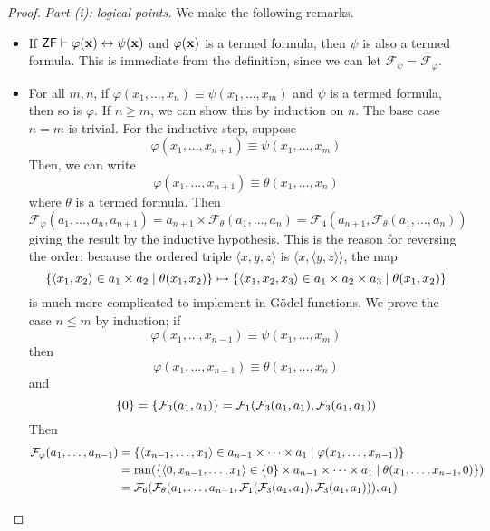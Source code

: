 \begin{proof}
    \emph{Part (i): logical points.}
    We make the following remarks.
    \begin{itemize}
        \item If \( \mathsf{ZF} \vdash \varphi(\vb x) \leftrightarrow \psi(\vb x) \) and \( \varphi(\vb x) \) is a termed formula, then \( \psi \) is also a termed formula.
        This is immediate from the definition, since we can let \( \mathcal F_\psi = \mathcal F_\varphi \).
        \item For all \( m, n \), if \( \varphi(x_1, \dots, x_n) \equiv \psi(x_1, \dots, x_m) \) and \( \psi \) is a termed formula, then so is \( \varphi \).
        If \( n \geq m \), we can show this by induction on \( n \).
        The base case \( n = m \) is trivial.
        For the inductive step, suppose
        \[ \varphi(x_1, \dots, x_{n+1}) \equiv \psi(x_1, \dots, x_m) \]
        Then, we can write
        \[ \varphi(x_1, \dots, x_{n+1}) \equiv \theta(x_1, \dots, x_n) \]
        where \( \theta \) is a termed formula.
        Then
        \[ \mathcal F_\varphi(a_1, \dots, a_n, a_{n+1}) = a_{n+1} \times \mathcal F_\theta(a_1, \dots, a_n) = \mathcal F_4(a_{n+1}, \mathcal F_\theta(a_1, \dots, a_n)) \]
        giving the result by the inductive hypothesis.
        This is the reason for reversing the order: because the ordered triple \( \langle x, y, z \rangle \) is \( \langle x, \langle y, z \rangle \rangle \), the map
        \[ \qty{\langle x_1, x_2 \rangle \in a_1 \times a_2 \mid \theta(x_1, x_2)} \mapsto \qty{\langle x_1, x_2, x_3 \rangle \in a_1 \times a_2 \times a_3 \mid \theta(x_1, x_2)} \]
        is much more complicated to implement in G\"odel functions.
        We prove the case \( n \leq m \) by induction; if
        \[ \varphi(x_1, \dots, x_{n-1}) \equiv \psi(x_1, \dots, x_m) \]
        then
        \[ \varphi(x_1, \dots, x_{n-1}) \equiv \theta(x_1, \dots, x_n) \]
        and
        \[ \qty{0} = \qty{\mathcal F_3(a_1, a_1)} = \mathcal F_1(\mathcal F_3(a_1, a_1), \mathcal F_3(a_1, a_1)) \]
        Then
        \begin{align*}
            \mathcal F_\varphi(a_1, \dots, a_{n-1}) &= \qty{\langle x_{n-1}, \dots, x_1 \rangle \in a_{n-1} \times \dots \times a_1 \mid \varphi(x_1, \dots, x_{n-1})} \\
            &= \ran(\qty{\langle 0, x_{n-1}, \dots, x_1 \rangle \in \qty{0} \times a_{n-1} \times \dots \times a_1 \mid \theta(x_1, \dots, x_{n-1}, 0)}) \\
            &= \mathcal F_6(\mathcal F_\theta(a_1, \dots, a_{n-1}, \mathcal F_1(\mathcal F_3(a_1, a_1), \mathcal F_3(a_1, a_1))), a_1)

\end{align*}
\end{itemize}
\end{proof}
